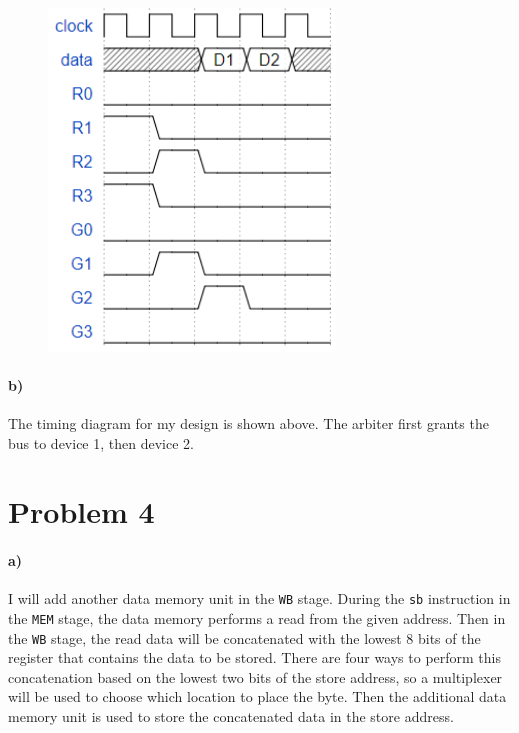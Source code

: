 \documentclass[12pt]{article}
\begin{document}
\begin{figure}[!ht]
        \begin{center}
                \includegraphics[width=3in]{problem3b.png}
        \end{center}
\end{figure}

\paragraph{b)}

The timing diagram for my design is shown above. The arbiter first grants the bus to device 1, then device 2.

\section*{Problem 4}

\paragraph{a)}

I will add another data memory unit in the \texttt{WB} stage. During the \texttt{sb} instruction in the \texttt{MEM} stage, the data memory
performs a read from the given address. Then in the \texttt{WB} stage, the read data will be concatenated with the lowest 8 bits of the register
that contains the data to be stored. There are four ways to perform this concatenation based on the lowest two bits of the store address, so a multiplexer
will be used to choose which location to place the byte. Then the additional data memory unit is used to store the concatenated data in the store address.
\end{document}
